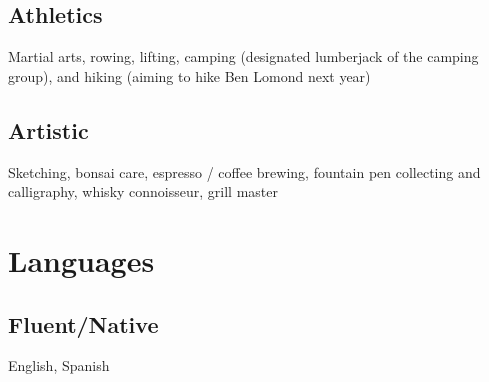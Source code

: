 \documentclass{adk_cv}
\begin{document}
\begin{minipage}[t]{\dimexpr.36\linewidth}
\begin{flushleft}
\subsection{Athletics}
Martial arts, rowing, lifting, camping (designated lumberjack of the camping group), and hiking (aiming to hike Ben Lomond next year)

\subsection{Artistic}
Sketching, bonsai care, espresso / coffee brewing, fountain pen collecting and calligraphy, whisky connoisseur, grill master


\section{Languages}
\subsection{Fluent/Native}
English, Spanish
    \end{flushleft}
\end{minipage}
\hfill\begingroup\hspace{-5pt}\endgroup\hfill
\end{document}
